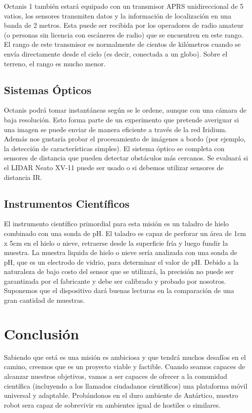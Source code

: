 \documentclass[a4paper,12pt]{article}
\begin{document}
Octanis 1 también estará equipado con un transmisor APRS unidireccional de 5 vatios, los sensores transmiten datos y la información de localización en una banda de 2 metros. Esta puede ser recibida por los operadores de radio amateur (o personas sin licencia con escáneres de radio) que se encuentren en este rango. El rango de este transmisor es normalmente de cientos de kilómetros cuando se envía directamente desde el cielo (es decir, conectada a un globo). Sobre el terreno, el rango es mucho menor.


\subsection{Sistemas Ópticos}
Octanis podrá tomar instantáneas según se le ordene, aunque con una cámara de baja resolución. Esto forma parte de un experimento que pretende averiguar si una imagen se puede enviar de manera eficiente a través de la red Iridium. Además nos gustaría probar el procesamiento de imágenes a bordo (por ejemplo, la detección de características simples). El sistema óptico se completa con sensores de distancia que pueden detectar obstáculos más cercanos. Se evaluará si el LIDAR Neato XV-11 \cite{lidar} puede ser usado o si debemos utilizar sensores de distancia IR.


\subsection{Instrumentos Científicos}
El instrumento científico primordial para esta misión es un taladro de hielo combinado con una sonda de pH. El taladro es capaz de perforar un área de 1cm x 5cm en el hielo o nieve, retraerse desde la superficie fría y luego fundir la muestra. La muestra liquida de hielo o nieve sería analizada con una sonda de pH, que es un electrodo de vidrio, para determinar el valor de pH. Debido a la naturaleza de bajo costo del sensor que se utilizará, la precisión no puede ser garantizada por el fabricante y debe ser calibrado y probado por nosotros. Suponemos que el dispositivo dará buenas lecturas en la comparación de una gran cantidad de muestras.

\pagebreak

\section{Conclusión}
Sabiendo que está es una misión es ambiciosa y que tendrá muchos desafíos en el camino, creemos que es un proyecto viable y factible. Cuando seamos capaces de alcanzar nuestros objetivos, vamos a ser capaces de ofrecer a la comunidad científica (incluyendo a los llamados ciudadanos científicos) una plataforma móvil universal y adaptable. Probándonos en el duro ambiente de Antártico, nuestro robot sera capaz de sobrevivir en ambientes igual de hostiles o similares.\\
\end{document}
